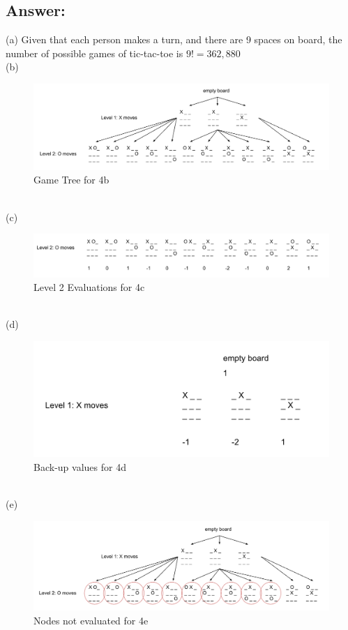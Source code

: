 \documentclass{article}
\begin{document}
\subsection*{Answer:}
(a) Given that each person makes a turn, and there are 9 spaces on board, the number of possible games of tic-tac-toe is $9! = 362,880$
\\
(b) 
\begin{figure}[h]
    \centering
    \includegraphics[width=1\textwidth]{part4b.png}
    \caption{Game Tree for 4b}
    \label{fig:sample}
\end{figure}
\\
(c)
\begin{figure}[h]
    \centering
    \includegraphics[width=1\textwidth]{part4c.png}
    \caption{Level 2 Evaluations for 4c}
    \label{fig:sample}
\end{figure}
\\
(d)
\begin{figure}[h]
    \centering
    \includegraphics[width=1\textwidth]{part4d.png}
    \caption{Back-up values for 4d}
    \label{fig:sample}
\end{figure}
\\
(e)
\begin{figure}
    \centering
    \includegraphics[width=1\textwidth]{part4e.png}
    \caption{Nodes not evaluated for 4e}
    \label{fig:sample}
\end{figure}
\end{document}
